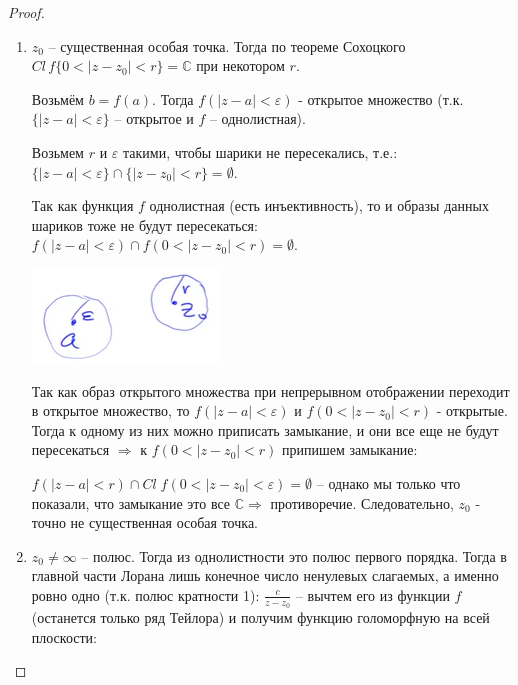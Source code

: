 \begin{proof}

    \begin{enumerate}
        \item {
            $z_0$ -- существенная особая точка. Тогда по теореме Сохоцкого
            $Cl \, f \{ 0 < |z - z_0| < r \} = \mathbb{C}$ при некотором $r$.

            Возьмём $b = f(a)$. Тогда $f(|z - a| < \varepsilon)$ - открытое множество (т.к. $\{|z - a| < \varepsilon\}$ -- открытое и $f$ -- однолистная).

            Возьмем $r$ и $\varepsilon$ такими, чтобы шарики не пересекались, т.е.: $\{|z - a| < \varepsilon\} \cap \{|z - z_0| < r\} = \emptyset$.

            Так как функция $f$ однолистная (есть инъективность), то и образы данных шариков тоже не будут пересекаться: $f(|z - a| < \varepsilon) \cap f(0 < |z - z_0| < r) = \emptyset$.

            \begin{center}
                \includegraphics[width=5    cm]{assets/04-functions-of-complex-variables/fractional-linear-functions.png}
            \end{center}

            Так как образ открытого множества при непрерывном отображении переходит в открытое множество, то $f(|z - a| < \varepsilon)$ и $f(0 < |z - z_0| < r)$ - открытые. Тогда к одному из них можно приписать замыкание, и они все еще не будут пересекаться $\Rightarrow$ к $f(0 < |z - z_0| < r)$ припишем замыкание:

            $f(|z - a| < r) \cap Cl \; f(0 < |z - z_0| < \varepsilon) = \emptyset$ -- однако мы только что показали, что замыкание это все $\mathbb{C} \Rightarrow$ противоречие. Следовательно, $z_0$ - точно не существенная особая точка.
        }
        \item {
            $z_0 \neq \infty$ -- полюс. Тогда из однолистности это полюс первого порядка. Тогда в главной части Лорана лишь конечное число ненулевых слагаемых, а именно ровно одно (т.к. полюс кратности 1): $\frac{c}{z-z_0}$ -- вычтем его из функции $f$ (останется только ряд Тейлора) и получим функцию голоморфную на всей плоскости:

}
\end{enumerate}
\end{proof}
